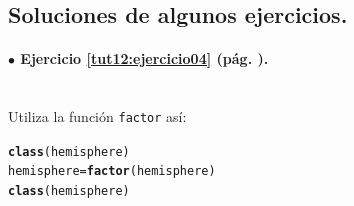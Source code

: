 \documentclass[10pt,a4paper]{article}\usepackage[]{graphicx}\usepackage[]{color}
\makeatletter
\newcommand{\hlstd}[1]{\textcolor[rgb]{0.345,0.345,0.345}{#1}}%
\newcommand{\hlkwb}[1]{\textcolor[rgb]{0.69,0.353,0.396}{#1}}%
\newcommand{\hlkwd}[1]{\textcolor[rgb]{0.737,0.353,0.396}{\textbf{#1}}}%
\newenvironment{kframe}{%
 \def\at@end@of@kframe{}%
 \ifinner\ifhmode%
  \def\at@end@of@kframe{\end{minipage}}%
  \begin{minipage}{\columnwidth}%
 \fi\fi%
 \def\FrameCommand##1{\hskip\@totalleftmargin \hskip-\fboxsep
 \colorbox{shadecolor}{##1}\hskip-\fboxsep
     \hskip-\linewidth \hskip-\@totalleftmargin \hskip\columnwidth}%
 \MakeFramed {\advance\hsize-\width
   \@totalleftmargin\z@ \linewidth\hsize
   \@setminipage}}%
 {\par\unskip\endMakeFramed%
 \at@end@of@kframe}
\newenvironment{knitrout}{}{} %
\makeatother
\begin{document}

\subsection*{Soluciones de algunos ejercicios.}
\label{tut12:subsec:SolucionesAlgunosEjercicios}







\paragraph{\bf $\bullet$ Ejercicio \ref{tut12:ejercicio04} (pág. \pageref{tut12:ejercicio04}).}
\label{tut12:ejercicio04:sol}\quad\\

Utiliza la función {\tt factor} así:
\begin{knitrout}
\color{fgcolor}\begin{kframe}
\begin{alltt}
\hlkwd{class}\hlstd{(hemisphere)}
\hlstd{hemisphere} \hlkwb{=} \hlkwd{factor}\hlstd{(hemisphere)}
\hlkwd{class}\hlstd{(hemisphere)}
\end{alltt}
\end{kframe}
\end{knitrout}
\end{document}
